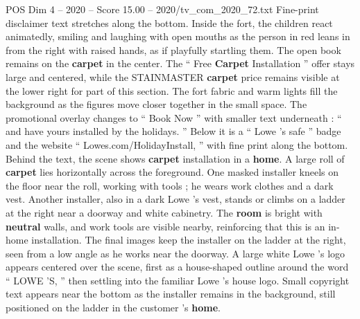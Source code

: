 \begin{textsample}{POS Dim 4 – 2020 – Score 15.00 – 2020/tv\_com\_2020\_72.txt}
Fine-print disclaimer text stretches along the bottom.
Inside the fort, the children react animatedly, smiling and laughing with open mouths as the person in red leans in from the right with raised hands, as if playfully startling them.
The open book remains on the \textbf{carpet} in the center.
The “ Free \textbf{Carpet} Installation ” offer stays large and centered, while the STAINMASTER \textbf{carpet} price remains visible at the lower right for part of this section.
The fort fabric and warm lights fill the background as the figures move closer together in the small space.
The promotional overlay changes to “ Book Now ” with smaller text underneath : “ and have yours installed by the holidays. ” Below it is a “ Lowe ’s safe ” badge and the website “ Lowes.com/HolidayInstall, ” with fine print along the bottom.
Behind the text, the scene shows \textbf{carpet} installation in a \textbf{home}.
A large roll of \textbf{carpet} lies horizontally across the foreground.
One masked installer kneels on the floor near the roll, working with tools ; he wears work clothes and a dark vest.
Another installer, also in a dark Lowe ’s vest, stands or climbs on a ladder at the right near a doorway and white cabinetry.
The \textbf{room} is bright with \textbf{neutral} walls, and work tools are visible nearby, reinforcing that this is an in-home installation.
The final images keep the installer on the ladder at the right, seen from a low angle as he works near the doorway.
A large white Lowe ’s logo appears centered over the scene, first as a house-shaped outline around the word “ LOWE ’S, ” then settling into the familiar Lowe ’s house logo.
Small copyright text appears near the bottom as the installer remains in the background, still positioned on the ladder in the customer ’s \textbf{home}.

\end{textsample}
